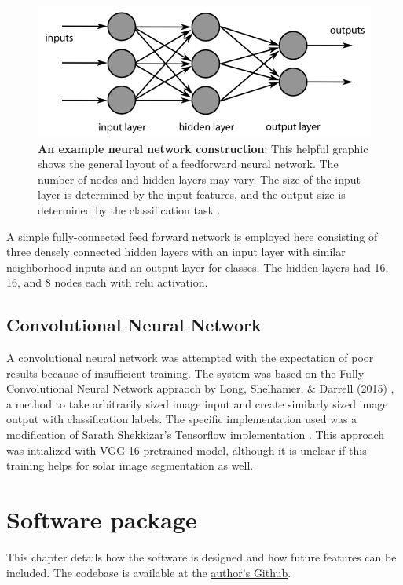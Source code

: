 \documentclass[twoside]{report}
\begin{document}
\begin{figure}[ht]
  \begin{center}
    \includegraphics[scale=0.5]{ffneural}
    \caption{{\bf An example neural network construction}: This helpful graphic shows the general layout of a feedforward neural network. The number of nodes and hidden layers may vary. The size of the input layer is determined by the input features, and the output size is determined by the classification task \cite{neuralexample}.}
 \end{center}
\end{figure}

A simple fully-connected feed forward network is employed here consisting of three densely connected hidden layers with an input layer with similar neighborhood inputs and an output layer for classes. The hidden layers had 16, 16, and 8 nodes each with relu activation. 

\section{Convolutional Neural Network}
A convolutional neural network was attempted with the expectation of poor results because of insufficient training. The system was based on the Fully Convolutional Neural Network appraoch by Long, Shelhamer, \& Darrell (2015) \cite{fcnn}, a method to take arbitrarily sized image input and create similarly sized image output with classification labels. The specific implementation used was a modification of Sarath Shekkizar's Tensorflow implementation \cite{fcnntensorflow}. This approach was intialized with VGG-16 pretrained model, although it is unclear if this training helps for solar image segmentation as well.

\chapter{Software package} 

This chapter details how the software is designed and how future features can be included. The codebase is available at the \href{https://github.com/jmbhughes/smachy}{author's Github}. 
\end{document}
